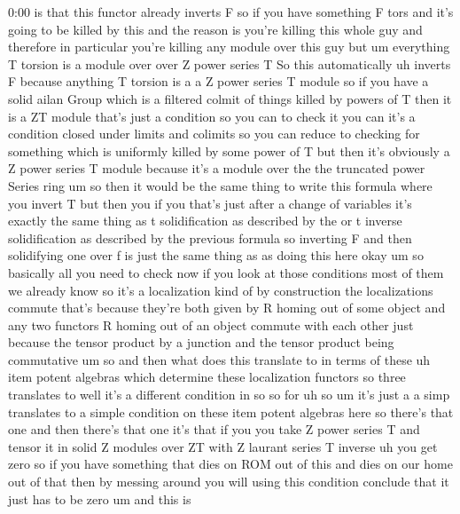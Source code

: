 \begin{unfinished}{0:00}
is  that  this  functor  already  inverts  F
so  if  you  have  something  F  tors  and  it's
going  to  be  killed  by  this  and  the
reason  is  you're  killing  this  whole  guy
and  therefore  in  particular  you're
killing  any  module  over  this  guy  but  um
everything  T  torsion  is  a  module  over
over  Z  power  series  T  So  this
automatically  uh  inverts
F  because  anything  T
torsion  is  a  a  Z  power  series  T
module  so  if  you  have  a  solid  ailan
Group  which  is  a  filtered  colmit  of
things  killed  by  powers  of  T  then  it  is
a  ZT  module  that's  just  a  condition  so
you  can  to  check  it  you  can  it's  a
condition  closed  under  limits  and
colimits  so  you  can  reduce  to  checking
for  something  which  is  uniformly  killed
by  some  power  of  T  but  then  it's
obviously  a  Z  power  series  T  module
because  it's  a  module  over  the  the
truncated  power  Series
ring  um  so  then  it  would  be  the  same
thing  to  write  this  formula  where  you
invert  T  but  then  you  if  you  that's  just
after  a  change  of  variables  it's  exactly
the  same  thing  as  t  solidification  as
described  by  the  or  t  inverse
solidification  as  described  by  the
previous  formula  so  inverting  F  and  then
solidifying  one  over  f  is  just  the  same
thing  as  as  doing  this
here
okay
um
so  basically  all  you  need  to  check  now
if  you  look  at  those  conditions  most  of
them  we  already  know  so  it's  a
localization  kind  of  by  construction  the
localizations  commute  that's  because
they're  both  given  by  R  homing  out  of
some  object  and  any  two  functors  R
homing  out  of  an  object  commute  with
each  other  just  because  the  tensor
product  by  a  junction  and  the  tensor
product  being
commutative  um
so  and  then  what  does  this  translate  to
in  terms  of  these  uh  item  potent
algebras  which  determine  these
localization  functors  so  three
translates
to  well  it's  a  different  condition  in  so
so
for  uh
so  um  it's  just  a  a  simp  translates  to  a
simple  condition  on  these  item  potent
algebras  here  so  there's  that  one  and
then  there's  that  one  it's  that  if  you
you  take  Z  power  series  T  and  tensor  it
in  solid  Z
modules  over  ZT  with  Z  laurant  series  T
inverse  uh  you  get
zero  so  if  you  have  something  that  dies
on  ROM  out  of  this  and  dies  on  our  home
out  of  that  then  by  messing  around  you
will  using  this  condition  conclude  that
it  just  has  to  be
zero  um  and  this  is

\end{unfinished}
